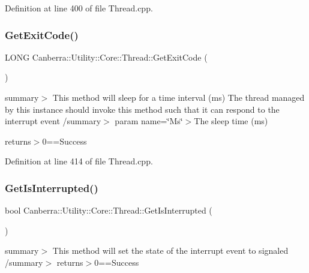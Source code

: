 Definition at line 400 of file Thread.\+cpp.

\mbox{\label{class_canberra_1_1_utility_1_1_core_1_1_thread_a2f42267504a9473a6800d4d36998194e_a2f42267504a9473a6800d4d36998194e}} 
\subsubsection{\texorpdfstring{Get\+Exit\+Code()}{GetExitCode()}}
{\footnotesize\ttfamily L\+O\+NG Canberra\+::\+Utility\+::\+Core\+::\+Thread\+::\+Get\+Exit\+Code (\begin{DoxyParamCaption}{ }\end{DoxyParamCaption})}

summary$>$ This method will sleep for a time interval (ms) The thread managed by this instance should invoke this method such that it can respond to the interrupt event /summary$>$ param name=\char`\"{}\+Ms\char`\"{}$>$The sleep time (ms)

returns$>$0==Success

Definition at line 414 of file Thread.\+cpp.

\mbox{\label{class_canberra_1_1_utility_1_1_core_1_1_thread_a3bdd38498aea2f23c5f04d1e13bc5672_a3bdd38498aea2f23c5f04d1e13bc5672}} 
\subsubsection{\texorpdfstring{Get\+Is\+Interrupted()}{GetIsInterrupted()}}
{\footnotesize\ttfamily bool Canberra\+::\+Utility\+::\+Core\+::\+Thread\+::\+Get\+Is\+Interrupted (\begin{DoxyParamCaption}{ }\end{DoxyParamCaption})}

summary$>$ This method will set the state of the interrupt event to signaled /summary$>$ returns$>$0==Success

